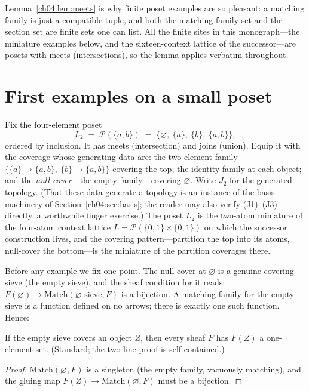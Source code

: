 Lemma~\ref{ch04:lem:meets} is why finite poset examples are so pleasant: a
matching family is just a compatible tuple, and both the matching-family set
and the section set are finite sets one can list. All the finite sites in this
monograph---the miniature examples below, and the sixteen-context lattice of
the successor---are posets with meets (intersections), so the lemma applies
verbatim throughout.

\section{First examples on a small poset}\label{ch04:sec:examples}

Fix the four-element poset
\[
L_2\;=\;\mathcal{P}(\{a,b\})\;=\;\{\varnothing,\ \{a\},\ \{b\},\ \{a,b\}\},
\]
ordered by inclusion. It has meets (intersection) and joins (union). Equip it
with the coverage whose generating data are: the two-element family
$\{\{a\}\to\{a,b\},\ \{b\}\to\{a,b\}\}$ covering the top; the identity family
at each object; and the \emph{null cover}---the empty family---covering
$\varnothing$. Write $J_2$ for the generated topology. (That these data
generate a topology is an instance of the basis machinery of
Section~\ref{ch04:sec:basis}; the reader may also verify (J1)--(J3) directly,
a worthwhile finger exercise.) The poset $L_2$ is the two-atom miniature of
the four-atom context lattice $L=\mathcal{P}(\{0,1\}\times\{0,1\})$ on which
the successor construction lives, and the covering pattern---partition the
top into its atoms, null-cover the bottom---is the miniature of the partition
coverages there.

Before any example we fix one point. The null cover at
$\varnothing$ is a genuine covering sieve (the empty sieve), and the sheaf
condition for it reads: $F(\varnothing)\to\mathrm{Match}(\varnothing\text{-sieve},F)$
is a bijection. A matching family for the empty sieve is a function defined on
no arrows; there is exactly one such function. Hence:

\begin{lemma}\label{ch04:lem:null}
If the empty sieve covers an object $Z$, then every sheaf $F$ has
$F(Z)$ a one-element set. (Standard; the two-line proof is self-contained.)
\end{lemma}

\begin{proof}
$\mathrm{Match}(\varnothing,F)$ is a singleton (the empty family, vacuously
matching), and the gluing map $F(Z)\to\mathrm{Match}(\varnothing,F)$ must be a
bijection.
\end{proof}

